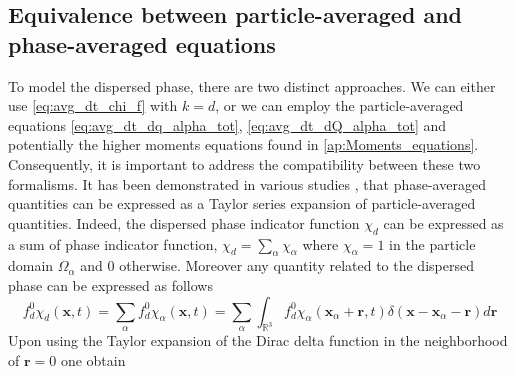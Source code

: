 
\subsection{Equivalence between particle-averaged and phase-averaged equations}
\label{sec:equivalence}
To model the dispersed phase, there are two distinct approaches. 
We can either use \ref{eq:avg_dt_chi_f} with $k=d$, or we can employ the particle-averaged equations \ref{eq:avg_dt_dq_alpha_tot}, \ref{eq:avg_dt_dQ_alpha_tot} and potentially the higher moments equations found in \ref{ap:Moments_equations}.
Consequently, it is important to address the compatibility between these two formalisms.
It has been demonstrated in various studies \citep{buyevich1979flow,lhuillier1992ensemble,jackson1997locally,zhang1994averaged}, that phase-averaged quantities can be expressed as a Taylor series expansion of particle-averaged quantities. 
Indeed, the dispersed phase indicator function $\chi_d$ can be expressed as a sum of phase indicator function, $\chi_d = \sum_\alpha\chi_\alpha$ where $\chi_\alpha =1$ in the particle domain $\Omega_\alpha$ and $0$ otherwise. 
Moreover any quantity related to the dispersed phase can be expressed as follows
\begin{equation*}
    f^0_d \chi_d(\textbf{x},t)
    = \sum_\alpha f^0_d \chi_\alpha(\textbf{x},t) 
    = \sum_\alpha \int_{\mathbb{R}^3} f^0_d \chi_\alpha(\textbf{x}_\alpha+\textbf{r},t)\delta(\textbf{x}- \textbf{x}_\alpha - \textbf{r}) d\textbf{r} 
    \label{eq:taylor_f_d}
\end{equation*}
Upon using the Taylor expansion of the Dirac delta function in the neighborhood of $\textbf{r}=0$ one obtain

